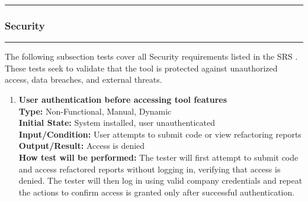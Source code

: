 \documentclass[12pt, titlepage]{article}
\newcommand{\colorrule}{\textcolor{BlueViolet}{\rule{\linewidth}{2pt}}}
\begin{document}
\newpage

\noindent
\colorrule

\subsubsection{Security}
\colorrule

\medskip

\noindent
The following subsection tests cover all Security requirements listed in the SRS \cite{SRS}. These tests seek to validate that the tool is protected against unauthorized access, data breaches, and external threats.

\begin{enumerate}[label={\bf \textcolor{Maroon}{test-SRT-\arabic*}}, wide=0pt, font=\itshape]
  \item \textbf{User authentication before accessing tool features} \\[2mm]
    \textbf{Type:} Non-Functional, Manual, Dynamic \\
    \textbf{Initial State:} System installed, user unauthenticated \\
    \textbf{Input/Condition:} User attempts to submit code or view refactoring reports \\
    \textbf{Output/Result:} Access is denied \\[2mm]
    \textbf{How test will be performed:} The tester will first attempt to submit code and access refactored reports without logging in, verifying that access is denied. The tester will then log in using valid company credentials and repeat the actions to confirm access is granted only after successful authentication.
  

\end{enumerate}
\end{document}
